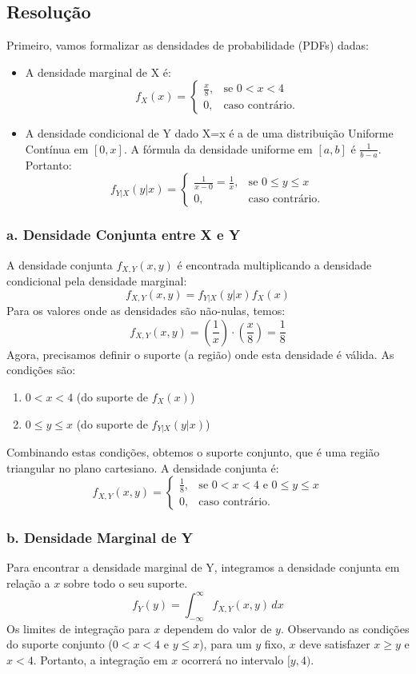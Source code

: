 \documentclass[12pt]{article}
\begin{document}
\subsection*{Resolução}
Primeiro, vamos formalizar as densidades de probabilidade (PDFs) dadas:
\begin{itemize}
    \item A densidade marginal de X é:
    \[ f_X(x) = \begin{cases} \frac{x}{8}, & \text{se } 0 < x < 4 \\ 0, & \text{caso contrário.} \end{cases} \]
    \item A densidade condicional de Y dado X=x é a de uma distribuição Uniforme Contínua em $[0,x]$. A fórmula da densidade uniforme em $[a,b]$ é $\frac{1}{b-a}$. Portanto:
    \[ f_{Y|X}(y|x) = \begin{cases} \frac{1}{x-0} = \frac{1}{x}, & \text{se } 0 \le y \le x \\ 0, & \text{caso contrário.} \end{cases} \]
\end{itemize}

\subsubsection*{a. Densidade Conjunta entre X e Y}
A densidade conjunta $f_{X,Y}(x,y)$ é encontrada multiplicando a densidade condicional pela densidade marginal:
\[ f_{X,Y}(x,y) = f_{Y|X}(y|x) f_X(x) \]
Para os valores onde as densidades são não-nulas, temos:
\[ f_{X,Y}(x,y) = \left(\frac{1}{x}\right) \cdot \left(\frac{x}{8}\right) = \frac{1}{8} \]
Agora, precisamos definir o suporte (a região) onde esta densidade é válida. As condições são:
\begin{enumerate}
    \item $0 < x < 4$ (do suporte de $f_X(x)$)
    \item $0 \le y \le x$ (do suporte de $f_{Y|X}(y|x)$)
\end{enumerate}
Combinando estas condições, obtemos o suporte conjunto, que é uma região triangular no plano cartesiano. A densidade conjunta é:
\[ f_{X,Y}(x,y) = \begin{cases} \frac{1}{8}, & \text{se } 0 < x < 4 \text{ e } 0 \le y \le x \\ 0, & \text{caso contrário.} \end{cases} \]

\subsubsection*{b. Densidade Marginal de Y}
Para encontrar a densidade marginal de Y, integramos a densidade conjunta em relação a $x$ sobre todo o seu suporte.
\[ f_Y(y) = \int_{-\infty}^{\infty} f_{X,Y}(x,y) \,dx \]
Os limites de integração para $x$ dependem do valor de $y$. Observando as condições do suporte conjunto ($0 < x < 4$ e $y \le x$), para um $y$ fixo, $x$ deve satisfazer $x \ge y$ e $x < 4$. Portanto, a integração em $x$ ocorrerá no intervalo $[y, 4)$.
\end{document}
